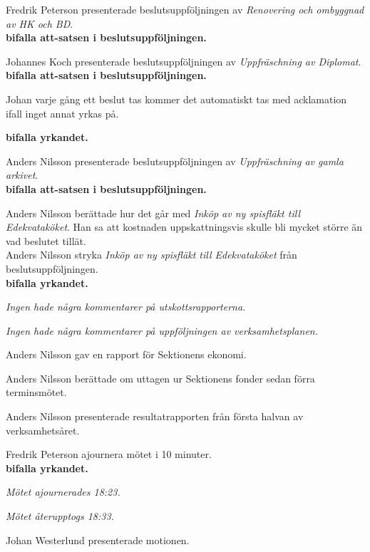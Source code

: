 \documentclass[10pt]{article}
\begin{document}
\begin{paragrafer}
Fredrik Peterson presenterade beslutsuppföljningen av \emph{Renovering och ombyggnad av HK och BD}.\\
\textbf{\Mba bifalla att-satsen i beslutsuppföljningen.}

Johannes Koch presenterade beslutsuppföljningen av \emph{Uppfräschning av Diplomat}.\\
\textbf{\Mba bifalla att-satsen i beslutsuppföljningen.}

Johan \ypa varje gång ett beslut tas kommer det automatiskt tas med acklamation ifall inget annat yrkas på. %

\textbf{\Mba bifalla yrkandet.}

Anders Nilsson presenterade beslutsuppföljningen av \emph{Uppfräschning av gamla arkivet}.\\
\textbf{\Mba bifalla att-satsen i beslutsuppföljningen.}

Anders Nilsson berättade hur det går med \emph{Inköp av ny spisfläkt till Edekvataköket}. Han sa att kostnaden uppskattningsvis skulle bli mycket större än vad beslutet tillät.\\
Anders Nilsson \ypa stryka \emph{Inköp av ny spisfläkt till Edekvataköket} från beslutsuppföljningen.\\
\textbf{\Mba bifalla yrkandet.}

\emph{Ingen hade några kommentarer på utskottsrapporterna.}

\emph{Ingen hade några kommentarer på uppföljningen av verksamhetsplanen.}

Anders Nilsson gav en rapport för Sektionens ekonomi.

Anders Nilsson berättade om uttagen ur Sektionens fonder sedan förra terminsmötet.

Anders Nilsson presenterade resultatrapporten från första halvan av verksamhetsåret.

Fredrik Peterson \ypa ajournera mötet i 10 minuter.\\
\textbf{bifalla yrkandet.}

\emph{Mötet ajournerades 18:23.}

\emph{Mötet återupptogs 18:33.}

    \begin{paragrafer}
        Johan Westerlund presenterade motionen.


\end{paragrafer}
\end{paragrafer}
\end{document}
